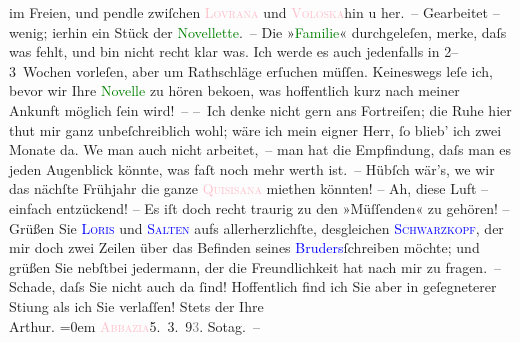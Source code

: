                im Freien, und pendle zwiſchen \textcolor{pink}{\textsc{Lovrana}}{}\ledrightnote{\textcolor{pink}{Lovran}} und \textcolor{pink}{\textsc{Voloska}}{}\ledrightnote{\textcolor{pink}{Volosko}}{ }{\pb}hin u her. – Gearbeitet – wenig; i{\geminationm}erhin ein Stück der \textcolor{green}{Novellette}{}. – Die »\textcolor{green}{Familie}{}\ledrightnote{\textcolor{green}{Familie}}« durchgeleſen, merke, daſs was fehlt, und bin nicht recht klar was.
               Ich werde es auch jedenfalls in 2–3 Wochen vorleſen, aber um Rathschläge erſuchen
               müſſen. Keineswegs leſe ich, bevor wir Ihre \textcolor{green}{Novelle}{} zu hören beko{\geminationm}en, was
               hoffentlich kurz nach meiner Ankunft möglich ſein wird! –\pend
           \pstart
           – Ich denke nicht gern ans Fortreiſen; die Ruhe hier thut mir ganz unbeſchreiblich
               wohl; wäre ich mein eigner Herr, ſo blieb’ ich zwei Monate da. We{\geminationn} man auch nicht {\pb}arbeitet, – man hat die Empfindung, daſs man es jeden Augenblick könnte, was faſt
               noch mehr werth ist. – Hübſch wär’s, we{\geminationn} wir das nächſte
               Frühjahr die ganze \textcolor{pink}{\textsc{Quisisana}}{}\ledrightnote{\textcolor{pink}{Pension Quisisana}} miethen könnten! – Ah, diese Luft – einfach entzückend! – Es iſt doch recht
               traurig zu den »Müſſenden« zu gehören! –\pend
           \pstart
           Grüßen Sie \textcolor{blue}{\textsc{Loris}}{}\ledrightnote{\textcolor{blue}{Hugo von Hofmannsthal}} und \textcolor{blue}{\textsc{Salten}}{}\ledrightnote{\textcolor{blue}{Felix Salten}} aufs allerherzlichſte, desgleichen \textcolor{blue}{\textsc{Schwarzkopf}}{}\ledrightnote{\textcolor{blue}{Gustav Schwarzkopf}}, der mir doch zwei Zeilen über das Befinden seines \textcolor{blue}{Bruders}{}ſchreiben möchte; und grüßen Sie nebſtbei
               jedermann, der die Freundlichkeit hat nach mir zu fragen. – Schade, daſs {\pb}Sie nicht auch da ſind! Hoffentlich find ich Sie aber
               in geſegneterer Sti{\geminationm}ung als ich Sie verlaſſen!\pend
           \pstart
           Stets der Ihre{\\[\baselineskip]}\spacefill\mbox{Arthur.}\pend
           \leftskip=0em{}\pstart
           \textcolor{pink}{\textsc{Abbazia}}{}\ledrightnote{\textcolor{pink}{Opatija}}5. 3. 9\textcolor{gray}{3}. So{\geminationn}tag. –\pend
           \endnumbering{}  
      